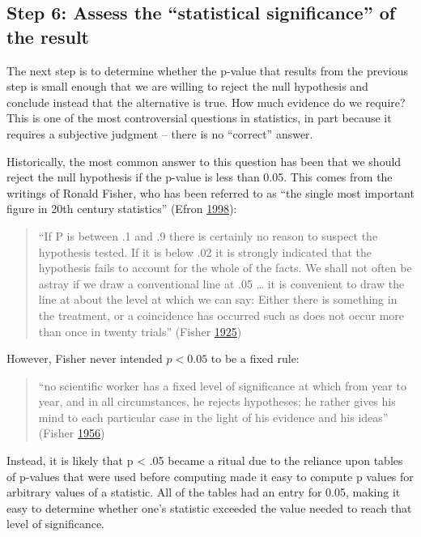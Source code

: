 \documentclass[12pt,]{book}
\theoremstyle{definition}
\theoremstyle{definition}
\theoremstyle{definition}
\theoremstyle{remark}
\begin{document}
\hypertarget{step-6-assess-the-statistical-significance-of-the-result}{%
\subsection{Step 6: Assess the ``statistical significance'' of the result}\label{step-6-assess-the-statistical-significance-of-the-result}}

The next step is to determine whether the p-value that results from the previous step is small enough that we are willing to reject the null hypothesis and conclude instead that the alternative is true. How much evidence do we require? This is one of the most controversial questions in statistics, in part because it requires a subjective judgment -- there is no ``correct'' answer.

Historically, the most common answer to this question has been that we should reject the null hypothesis if the p-value is less than 0.05. This comes from the writings of Ronald Fisher, who has been referred to as ``the single most important figure in 20th century statistics'' (Efron \protect\hyperlink{ref-efron1998}{1998}):

\begin{quote}
``If P is between .1 and .9 there is certainly no reason to suspect the hypothesis tested. If it is below .02 it is strongly indicated that the hypothesis fails to account for the whole of the facts. We shall not often be astray if we draw a conventional line at .05 \ldots{} it is convenient to draw the line at about the level at which we can say: Either there is something in the treatment, or a coincidence has occurred such as does not occur more than once in twenty trials'' (Fisher \protect\hyperlink{ref-fisher1925statistical}{1925})
\end{quote}

However, Fisher never intended \(p < 0.05\) to be a fixed rule:

\begin{quote}
``no scientific worker has a fixed level of significance at which from year to year, and in all circumstances, he rejects hypotheses; he rather gives his mind to each particular case in the light of his evidence and his ideas'' (Fisher \protect\hyperlink{ref-fish:1956}{1956})
\end{quote}

Instead, it is likely that p \textless{} .05 became a ritual due to the reliance upon tables of p-values that were used before computing made it easy to compute p values for arbitrary values of a statistic. All of the tables had an entry for 0.05, making it easy to determine whether one's statistic exceeded the value needed to reach that level of significance.
\end{document}
